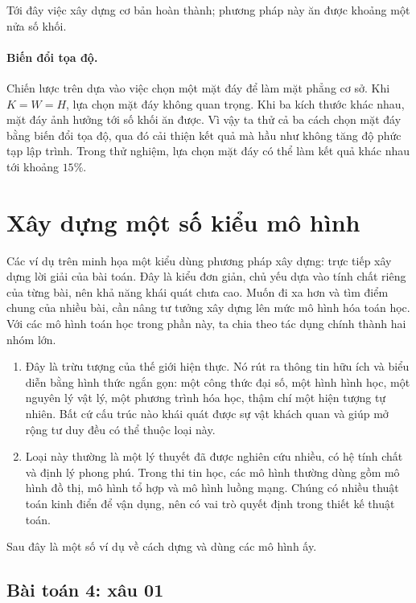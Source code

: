 \documentclass[11pt]{article}
\newcommand{\problem}[1]{\subsection*{#1}}
\begin{document}
Tới đây việc xây dựng cơ bản hoàn thành; phương pháp này ăn được khoảng một
nửa số khối.

\paragraph{Biến đổi tọa độ.}
Chiến lược trên dựa vào việc chọn một mặt đáy để làm mặt phẳng cơ sở. Khi
$K=W=H$, lựa chọn mặt đáy không quan trọng. Khi ba kích thước khác nhau, mặt
đáy ảnh hưởng tới số khối ăn được. Vì vậy ta thử cả ba cách chọn mặt đáy bằng
biến đổi tọa độ, qua đó cải thiện kết quả mà hầu như không tăng độ phức tạp
lập trình. Trong thử nghiệm, lựa chọn mặt đáy có thể làm kết quả khác nhau
tới khoảng $15\%$.

\section{Xây dựng một số kiểu mô hình}

Các ví dụ trên minh họa một kiểu dùng phương pháp xây dựng: trực tiếp xây
dựng lời giải của bài toán. Đây là kiểu đơn giản, chủ yếu dựa vào tính chất
riêng của từng bài, nên khả năng khái quát chưa cao. Muốn đi xa hơn và tìm
điểm chung của nhiều bài, cần nâng tư tưởng xây dựng lên mức mô hình hóa toán
học. Với các mô hình toán học trong phần này, ta chia theo tác dụng chính
thành hai nhóm lớn.

\begin{enumerate}
  \item {} Đây là trừu tượng của thế giới
  hiện thực. Nó rút ra thông tin hữu ích và biểu diễn bằng hình thức ngắn
  gọn: một công thức đại số, một hình hình học, một nguyên lý vật lý, một
  phương trình hóa học, thậm chí một hiện tượng tự nhiên. Bất cứ cấu trúc nào
  khái quát được sự vật khách quan và giúp mở rộng tư duy đều có thể thuộc
  loại này.

  \item {} Loại này thường là một lý
  thuyết đã được nghiên cứu nhiều, có hệ tính chất và định lý phong phú. Trong
  thi tin học, các mô hình thường dùng gồm mô hình đồ thị, mô hình tổ hợp và
  mô hình luồng mạng. Chúng có nhiều thuật toán kinh điển để vận dụng, nên có
  vai trò quyết định trong thiết kế thuật toán.
\end{enumerate}

Sau đây là một số ví dụ về cách dựng và dùng các mô hình ấy.

\problem{Bài toán 4: xâu 01}
\end{document}
